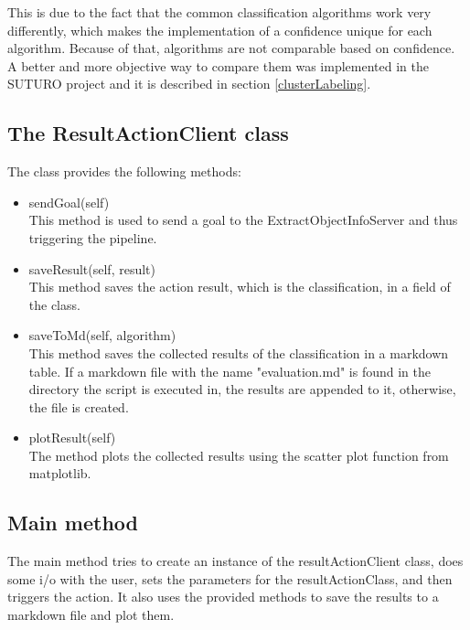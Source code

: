 \documentclass[main.tex]{subfiles}
\begin{document}
This is due to the fact that the common classification algorithms work very differently, which makes the implementation of a confidence unique for each algorithm. Because of that, algorithms are not comparable based on confidence. A better and more objective way to compare them was implemented in the SUTURO project and it is described in section \ref{clusterLabeling}.


 

\subsection{The ResultActionClient class}
The class provides the following methods:

\begin{itemize}
\item 
sendGoal(self)\\
This method is used to send a goal to the ExtractObjectInfoServer and thus triggering the pipeline.

\item saveResult(self, result)\\
This method saves the action result, which is the classification, in a field of the class.

\item saveToMd(self, algorithm)\\
This method saves the collected results of the classification in a markdown table. If a markdown file with the name "evaluation.md" is found in the directory the script is executed in, the results are appended to it, otherwise, the file is created.

\item plotResult(self)\\
The method plots the collected results using the scatter plot function from matplotlib.
\end{itemize}

\subsection{Main method}
The main method tries to create an instance of the resultActionClient class, does some i/o with the user, sets the parameters for the resultActionClass, and then triggers the action. It also uses the provided methods to save the results to a markdown file and plot them.
\end{document}
